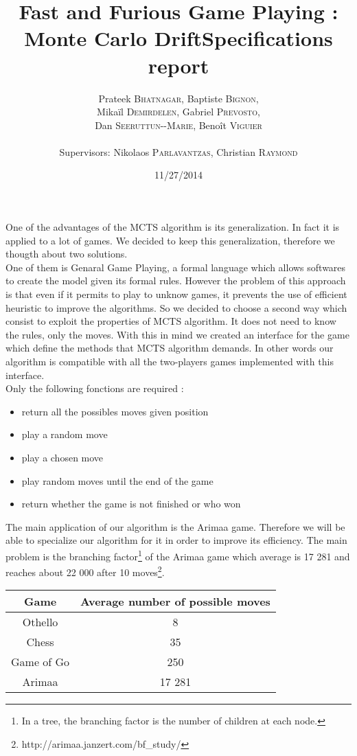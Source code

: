 \documentclass[12pt]{article}
\title{Fast and Furious Game Playing : Monte Carlo Drift\smallbreak Specifications report} %
\author{Prateek \textsc{Bhatnagar}, Baptiste \textsc{Bignon}, \\
		Mikaïl \textsc{Demirdelen}, Gabriel \textsc{Prevosto}, \\
		Dan \textsc{Seeruttun-{}-Marie}, Benoît \textsc{Viguier} \\
		\\
		Supervisors: Nikolaos \textsc{Parlavantzas}, Christian \textsc{Raymond}}
\date{11/27/2014}
\begin{document}
\maketitle
One of the advantages of the MCTS algorithm is its generalization. In fact it is applied to a lot of games. We decided to keep this generalization, therefore we thougth about two solutions.
\bigskip\\
One of them is Genaral Game Playing, a formal language which allows softwares to create the model given its formal rules. However the problem of this approach is that even if it permits to play to unknow games, it prevents the use of efficient heuristic to improve the algorithms.
So we decided to choose a second way which consist to exploit the properties of MCTS algorithm. 
It does not need to know the rules, only the moves. With this in mind we created an interface for the game which define the methods that MCTS algorithm demands. In other words our algorithm is compatible with all the two-players games implemented with this interface.
\bigskip\\
Only the following fonctions are required : 
\begin{itemize}
\item return all the possibles moves given position
\item play a random move
\item play a chosen move 
\item play random moves until the end of the game
\item return whether the game is not finished or who won
\end{itemize}
The main application of our algorithm is the Arimaa game. Therefore we will be able to specialize our algorithm for it in order to improve its efficiency. The main problem is the branching factor\footnote{In a tree, the branching factor is the number of children at each node.} of the Arimaa game which average is 17 281 and reaches about 22 000 after 10 moves\footnote{http://arimaa.janzert.com/bf\_study/}.\\
\bigskip
\begin{center}
	\begin{tabular}{ | c | c |}
		\hline Game & Average number of possible moves \\ \hline
		\hline  
		Othello & 8\\
		\hline  
		Chess & 35\\
		\hline  
		Game of Go & 250\\
		\hline
		Arimaa & 17 281\\
		\hline
	\end{tabular}
\end{center}
\end{document}
